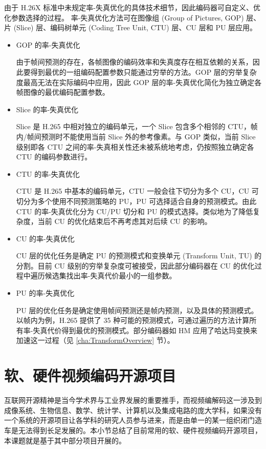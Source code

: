 由于 H.26X 标准中未规定率-失真优化的具体技术细节，因此编码器可自定义、优化参数选择的过程。
率-失真优化方法可在图像组 (Group of Pictures, GOP) 层、片 (Slice) 层、编码树单元 (Coding Tree Unit, CTU) 层、CU 层和 PU 层应用。
\begin{itemize}
    \item GOP 的率-失真优化

          由于帧间预测的存在，各帧图像的编码效率和失真度存在相互依赖的关系，因此要得到最优的一组编码配置参数只能通过穷举的方法。GOP 层的穷举复杂度最高无法在实际编码中应用，因此 GOP 层的率-失真优化简化为独立确定各帧图像的最优编码配置参数。

    \item Slice 的率-失真优化

          Slice 是 H.265 中相对独立的编码单元，一个 Slice 包含多个相邻的 CTU，帧内/帧间预测时不能使用当前 Slice 外的参考像素。与 GOP 类似，当前 Slice 级别即各 CTU 之间的率-失真相关性还未被系统地考虑，仍按照独立确定各 CTU 的编码参数进行。

    \item CTU 的率-失真优化

          CTU 是 H.265 中基本的编码单元，CTU 一般会往下切分为多个 CU，CU 可切分为多个使用不同预测策略的 PU，PU 可选择适合自身的预测模式。由此 CTU 的率-失真优化分为 CU/PU 切分和 PU 的模式选择。类似地为了降低复杂度，当前 CU 的优化结束后不再考虑其对后续 CU 的影响。

    \item CU 的率-失真优化

          CU 层的优化任务是确定 PU 的预测模式和变换单元 (Transform Unit, TU) 的分割。目前 CU 级别的穷举复杂度可被接受，因此部分编码器在 CU 的优化过程中遍历候选集找出率-失真代价最小的一组参数。

    \item PU 的率-失真优化

          PU 层的优化任务是确定使用帧间预测还是帧内预测，以及具体的预测模式。以帧内为例，H.265 提供了 35 种可能的预测模式，可通过遍历的方法计算所有率-失真代价得到最优的预测模式。部分编码器如 HM 应用了哈达玛变换来加速这一过程（见 \ref{cha:TransformOverview} 节）。
\end{itemize}

\section{软、硬件视频编码开源项目}
互联网开源精神是当今学术界与工业界发展的重要推手，而视频编解码这一涉及到成像系统、生物信息、数学、统计学、计算机以及集成电路的庞大学科，如果没有一个系统的开源项目让各学科的研究人员参与进来，而是由单一的某一组织闭门造车是无法得到长足发展的。本小节总结了目前常用的软、硬件视频编码开源项目，本课题就是基于其中部分项目开展的。
